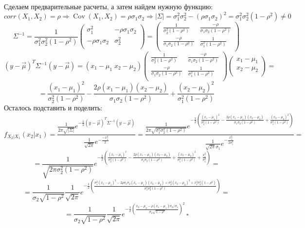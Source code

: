 \documentclass[a4paper,12pt]{article}
\def \cov{{\operatorname{Cov}}}
\begin{document}
Сделаем предварительные расчеты, а затем найдем нужную функцию:
\[
corr(X_1, X_2) = \rho \Rightarrow \cov(X_1, X_2) = \rho \sigma_1 \sigma_2 \Rightarrow |\Sigma| = \sigma_1^2 \sigma_2^2 - (\rho \sigma_1 \sigma_2)^2 = \sigma_1^2 \sigma_2^2 (1 - \rho^2) \ne 0
\]
\[
\Sigma^{-1} = \frac{1}{\sigma_1^2 \sigma_2^2 (1 - \rho^2)}
\begin{pmatrix}
\sigma_1^2 & -\rho \sigma_1 \sigma_2 \\
-\rho \sigma_1 \sigma_2 & \sigma_2^2 \\
\end{pmatrix}
=
\begin{pmatrix}
\frac{1}{\sigma_2^2 (1 - \rho^2)} & \frac{-\rho}{\sigma_1 \sigma_2 (1 - \rho^2)} \\
\frac{-\rho}{\sigma_1 \sigma_2 (1 - \rho^2)} & \frac{1}{\sigma_1^2 (1 - \rho^2)} \\
\end{pmatrix}
\]
\[
(y - \vec{\mu})^T \Sigma^{-1} (y - \vec{\mu}) = (x_1 - \mu_1 \; x_2 - \mu_2)
\begin{pmatrix}
\frac{1}{\sigma_2^2 (1 - \rho^2)} & \frac{-\rho}{\sigma_1 \sigma_2 (1 - \rho^2)} \\
\frac{-\rho}{\sigma_1 \sigma_2 (1 - \rho^2)} & \frac{1}{\sigma_1^2 (1 - \rho^2)} \\
\end{pmatrix}
\begin{pmatrix}
x_1 - \mu_1 \\
x_2 - \mu_2 \\
\end{pmatrix}
=
\]
\[
= \frac{(x_1 - \mu_1)^2}{\sigma_2^2 (1 - \rho^2)} - \frac{2\rho (x_1 - \mu_1)(x_2 - \mu_2)}{\sigma_1 \sigma_2 (1 - \rho^2)} + \frac{(x_2 - \mu_2)^2}{\sigma_1^2 (1 - \rho^2)}
\]
Осталось подставить и поделить:
\[
f_{X_2 | X_1} (x_2 | x_1) = \frac{\frac{1}{2\pi \sqrt{|\Sigma|}} e^{-\frac{1}{2} (y - \vec{\mu})^T \Sigma^{-1} (y - \vec{\mu})}}{\frac{1}{\sqrt{2\pi}} e^{-\frac{-x_1^2}{2}}} = \frac{\frac{1}{2\pi \sqrt{\sigma_1^2 \sigma_2^2 (1 - \rho^2)}} e^{-\frac{1}{2} \left(\frac{(x_1 - \mu_1)^2}{\sigma_2^2 (1 - \rho^2)} - \frac{2\rho (x_1 - \mu_1)(x_2 - \mu_2)}{\sigma_1 \sigma_2 (1 - \rho^2)} + \frac{(x_2 - \mu_2)^2}{\sigma_1^2 (1 - \rho^2)}\right)}}{\frac{1}{\sqrt{2\pi}\sigma_1} e^{-\frac{x_1^2}{2\sigma_1^2}}} =
\]
\[
=\frac{1}{\sqrt{2\pi \sigma_2^2 (1 - \rho^2)}} e^{-\frac{1}{2} \left(\frac{(x_1 - \mu_1)^2}{\sigma_2^2 (1 - \rho^2)} - \frac{2\rho (x_1 - \mu_1)(x_2 - \mu_2)}{\sigma_1 \sigma_2 (1 - \rho^2)} + \frac{(x_2 - \mu_2)^2}{\sigma_1^2 (1 - \rho^2)}+\frac{x_1^2}{\sigma_1^2}\right)} =
\]
\[
= \frac{1}{\sigma_2\sqrt{1 - \rho^2}}\frac{1}{\sqrt{2\pi}} e^{-\frac{1}{2} \left(\frac{\sigma_1^2(x_1 - \mu_1)^2 - 2\rho \sigma_1 \sigma_2 (x_1 - \mu_1)(x_2 - \mu_2) + \sigma_2^2(x_2 - \mu_2)^2 + x_1^2 \sigma_2^2 (1 - \rho^2)}{\sigma_1^2 \sigma_2^2 (1 - \rho^2)}\right)} =
\]
\[
= \frac{1}{\sigma_2\sqrt{1 - \rho^2}}\frac{1}{\sqrt{2\pi}} e^{-\frac{1}{2} \left(\frac{x_2 - \mu_2 - \rho(x_1 - \mu_1) \sigma_2 / \sigma_1}{\sigma_2\sqrt{1 - \rho^2}}\right)^2} \, \square
\]
\end{document}
